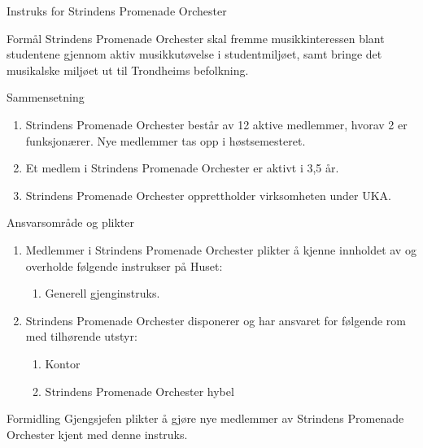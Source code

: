 \documentclass[../fsbok.tex]{subfiles}
\begin{document}
\begin{instruks*}{Instruks for Strindens Promenade Orchester}
    \begin{instruksledd}{Formål}
        Strindens Promenade Orchester skal fremme musikkinteressen blant studentene gjennom aktiv
        musikkutøvelse i studentmiljøet, samt bringe det musikalske miljøet ut til Trondheims befolkning.
    \end{instruksledd}

    \begin{instruksledd}{Sammensetning}
        \begin{enumerate}
            \item Strindens Promenade Orchester består av 12 aktive medlemmer, hvorav 2 er funksjonærer. Nye medlemmer tas opp i høstsemesteret.
            \item Et medlem i Strindens Promenade Orchester er aktivt i 3,5 år.
            \item Strindens Promenade Orchester opprettholder virksomheten under UKA.
        \end{enumerate}
    \end{instruksledd}

    \begin{instruksledd}{Ansvarsområde og plikter}
        \begin{enumerate}
            \item Medlemmer i Strindens Promenade Orchester plikter å kjenne innholdet av og overholde følgende instrukser
                på Huset:
                \begin{enumerate}
                    \item Generell gjenginstruks.
                \end{enumerate}
        \item Strindens Promenade Orchester disponerer og har ansvaret for følgende rom med tilhørende utstyr:
            \begin{enumerate}
                \item Kontor
                \item Strindens Promenade Orchester hybel
            \end{enumerate}
        \end{enumerate}
    \end{instruksledd}

    \begin{instruksledd}{Formidling}
        Gjengsjefen plikter å gjøre nye medlemmer av Strindens Promenade Orchester kjent med denne instruks.
    \end{instruksledd}

\end{instruks*}
\end{document}
